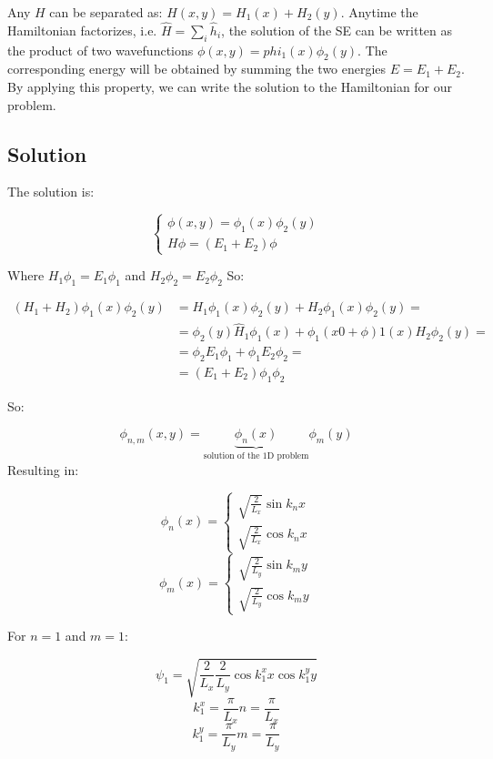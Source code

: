 Any $H$ can be separated as: $H(x,y) = H_1(x) + H_2(y)$.
Anytime the Hamiltonian factorizes, i.e. $\hat{H}=\sum_i{\hat{h}_i}$, the solution of the SE can be written as the product of two wavefunctions $\phi(x,y)=phi_1(x)\phi_2(y)$. The corresponding energy will be obtained by summing the two energies $E=E_1+E_2$. By applying this property, we can write the solution to the Hamiltonian for our problem.
  
  \subsection{Solution}
  The solution is:

  $$\begin{cases}\phi(x,y) = \phi_1(x)\phi_2(y)\\H\phi=(E_1+E_2)\phi\end{cases}$$

  Where $H_1\phi_1 = E_1\phi_1$  and $H_2\phi_2 = E_2\phi_2$
  So:

  \begin{align*}
    (H_1 + H_2)\phi_1(x)\phi_2(y) &= H_1\phi_1(x)\phi_2(y) + H_2\phi_1(x)\phi_2(y)=\\
                                  &= \phi_2(y)\hat{H}_1\phi_1(x)+\phi_1(x0+\phi)1(x)H_2\phi_2(y)=\\
                                  &= \phi_2 E_1\phi_1 + \phi_1E_2\phi_2=\\
                                  &=(E_1+E_2)\phi_1\phi_2
  \end{align*}

  So:

  $$\phi_{n,m}(x,y) = \underbrace{\phi_n(x)}_{\text{solution of the 1D problem}}\phi_m(y)$$
  Resulting in:
  
  $$\phi_n(x) = \begin{cases}\sqrt{\frac{2}{L_{x}}} \sin k_n x\\ \sqrt{\frac{2}{L_{x}}} \cos k_n x\end{cases}$$
  $$\phi_m(x) = \begin{cases}\sqrt{\frac{2}{L_{y}}} \sin k_m y\\ \sqrt{\frac{2}{L_{y}}} \cos k_m y\end{cases}$$
  
  For $n=1$ and $m=1$:
  
  $$\psi_1 = \sqrt{\frac{2}{L_{x}}\frac{2}{L_{y}} \cos k_1^x x \cos k_1^y y}$$ 
  $$k_1^x = \frac{\pi}{L_{x}} n = \frac{\pi}{L_{x}}$$
  $$k_1^y = \frac{\pi}{L_{y}} m = \frac{\pi}{L_{y}}$$
  
